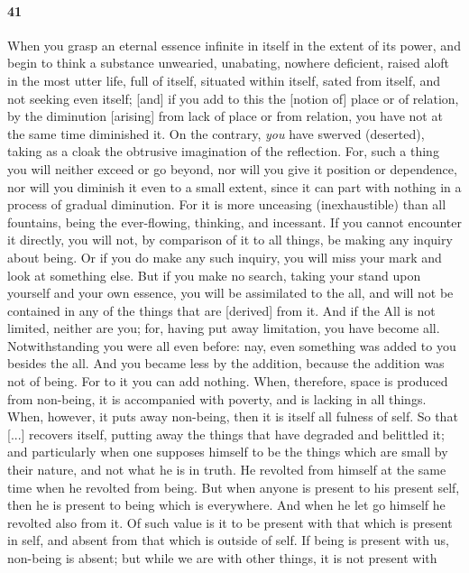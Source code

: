 \documentclass[12pt]{article}
\begin{document}
\paragraph{41} When you grasp an eternal essence infinite in itself in the
extent of its power, and begin to think a substance unwearied, unabating,
nowhere deficient, raised aloft in the most utter life, full of itself,
situated within itself, sated from itself, and not seeking even itself; [and]
if you add to this the [notion of] place or of relation, by the diminution
[arising] from lack of place or from relation, you have not at the same time
diminished it. On the contrary, \textit{you} have swerved (deserted), taking as
a cloak the obtrusive imagination of the reflection. For, such a thing you will
neither exceed or go beyond, nor will you give it position or dependence, nor
will you diminish it even to a small extent, since it can part with nothing in
a process of gradual diminution. For it is more unceasing (inexhaustible) than
all fountains, being the ever-flowing, thinking, and incessant. If you cannot
encounter it directly, you will not, by comparison of it to all things, be
making any inquiry about being. Or if you do make any such inquiry, you will
miss your mark and look at something else. But if you make no search, taking
your stand upon yourself and your own essence, you will be assimilated to the
all, and will not be contained in any of the things that are [derived] from it.
And if the All is not limited, neither are you; for, having put away
limitation, you have become all. Notwithstanding you were all even before: nay,
even something was added to you besides the all. And you became less by the
addition, because the addition was not of being. For to it you can add nothing.
When, therefore, space is produced from non-being, it is accompanied with
poverty, and is lacking in all things. When, however, it puts away non-being,
then it is itself all fulness of self. So that [...] recovers itself, putting
away the things that have degraded and belittled it; and particularly when one
supposes himself to be the things which are small by their nature, and not what
he is in truth. He revolted from himself at the same time when he revolted from
being. But when anyone is present to his present self, then he is present to
being which is everywhere. And when he let go himself he revolted also from it.
Of such value is it to be present with that which is present in self, and
absent from that which is outside of self. If being is present with us,
non-being is absent; but while we are with other things, it is not present with
\end{document}
